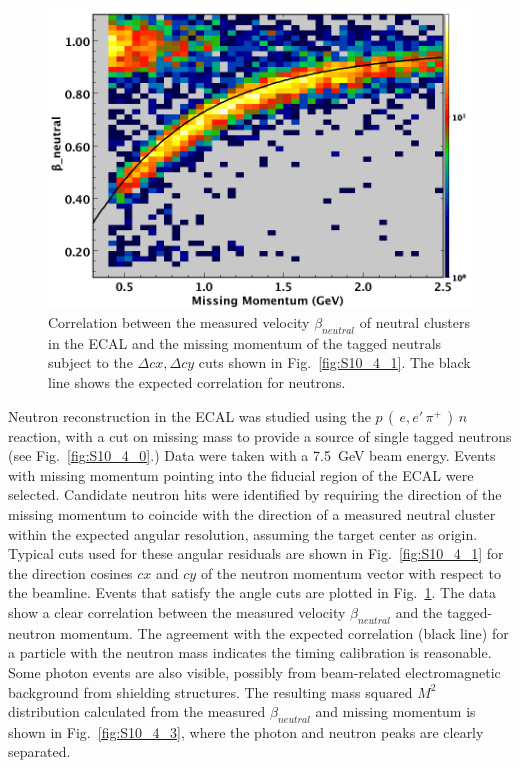 \begin{figure}[h]
\centering
\includegraphics[width=1.0\columnwidth,keepaspectratio]{img/S10_4_2.png}
\caption[]{Correlation between the measured velocity $\beta_{neutral}$ of neutral clusters in the ECAL and the
  missing momentum of the tagged neutrals subject to the $\Delta cx,\Delta cy$ cuts shown in
  Fig.~\ref{fig:S10_4_1}. The black line shows the expected correlation for neutrons.}
\label{fig:S10_4_2}
\end{figure}

Neutron reconstruction in the ECAL was studied using the $p\,(\,e,e'\,\pi^+\,)\,n$ reaction, with a cut on missing
mass to provide a source of single tagged neutrons (see Fig.~\ref{fig:S10_4_0}.) Data were taken with a 7.5~GeV
beam energy. Events with missing momentum pointing into the fiducial region of the ECAL were selected. Candidate
neutron hits were identified by requiring the direction of the missing momentum to coincide with the direction of a
measured neutral cluster within the expected angular resolution, assuming the target center as origin. Typical cuts
used for these angular residuals are shown in Fig.~\ref{fig:S10_4_1} for the direction cosines $cx$ and $cy$ of
the neutron momentum vector with respect to the beamline. Events that satisfy the angle cuts are plotted in
Fig.~\ref{fig:S10_4_2}. The data show a clear correlation between the measured velocity $\beta_{neutral}$ and the
tagged-neutron momentum. The agreement with the expected correlation (black line) for a particle with the neutron
mass indicates the timing calibration is reasonable. Some photon events are also visible, possibly from beam-related
electromagnetic background from shielding structures. The resulting mass squared $M^2$ distribution calculated
from the measured $\beta_{neutral}$ and missing momentum is shown in Fig.~\ref{fig:S10_4_3}, where the photon
and neutron peaks are clearly separated. 

